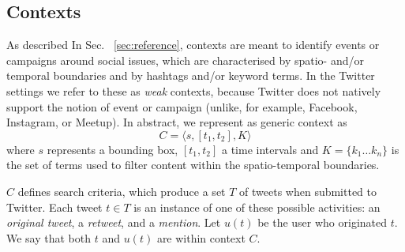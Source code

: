 \documentclass[runningheads]{llncs}
\begin{document}
	
	
\subsection{Contexts}

As described In Sec. ~\ref{sec:reference}, contexts are meant to identify events or campaigns around social issues, which are characterised by spatio- and/or temporal boundaries and by hashtags and/or keyword terms.
In the Twitter settings we refer to these as \textit{weak} contexts, because Twitter does not natively support the notion of event or campaign (unlike, for example, Facebook, Instagram, or Meetup).
In abstract, we represent as generic context as
\begin{equation}
    C = \langle s, [t_1, t_2], K \rangle 
    \label{eq:context}
\end{equation}
where $s$ represents a bounding box, $[t_1, t_2]$ a time intervals and $K = \{ k_1 \dots k_n\}$ is the set of terms used to filter content within the spatio-temporal boundaries.

$C$ defines search criteria, which produce a set $T$ of tweets when submitted to Twitter.
Each tweet $t \in T$ is an instance of one of these possible activities: an \textit{original tweet}, a \textit{retweet}, and a \textit{mention}.
Let $u(t)$ be the user who originated $t$.
We say that both $t$ and  $u(t)$ are within context $C$.
\end{document}
